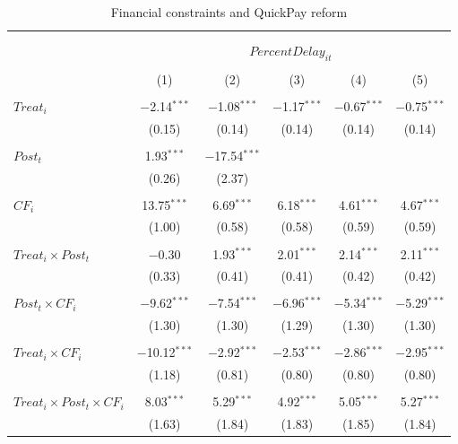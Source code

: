 \documentclass[
]{article}
\begin{document}
\begin{table}[H] \centering 
  \caption{Financial constraints and QuickPay reform} 
  \label{} 
\small 
\begin{tabular}{@{\extracolsep{-2pt}}lccccc} 
\\[-1.8ex]\hline 
\hline \\[-1.8ex] 
\\[-1.8ex] & \multicolumn{5}{c}{$PercentDelay_{it}$  } \\ 
\\[-1.8ex] & (1) & (2) & (3) & (4) & (5)\\ 
\hline \\[-1.8ex] 
 $Treat_i$ & $-$2.14$^{***}$ & $-$1.08$^{***}$ & $-$1.17$^{***}$ & $-$0.67$^{***}$ & $-$0.75$^{***}$ \\ 
  & (0.15) & (0.14) & (0.14) & (0.14) & (0.14) \\ 
  & & & & & \\ 
 $Post_t$ & 1.93$^{***}$ & $-$17.54$^{***}$ &  &  &  \\ 
  & (0.26) & (2.37) &  &  &  \\ 
  & & & & & \\ 
 $CF_i$ & 13.75$^{***}$ & 6.69$^{***}$ & 6.18$^{***}$ & 4.61$^{***}$ & 4.67$^{***}$ \\ 
  & (1.00) & (0.58) & (0.58) & (0.59) & (0.59) \\ 
  & & & & & \\ 
 $Treat_i \times Post_t$ & $-$0.30 & 1.93$^{***}$ & 2.01$^{***}$ & 2.14$^{***}$ & 2.11$^{***}$ \\ 
  & (0.33) & (0.41) & (0.41) & (0.42) & (0.42) \\ 
  & & & & & \\ 
 $Post_t \times CF_i$ & $-$9.62$^{***}$ & $-$7.54$^{***}$ & $-$6.96$^{***}$ & $-$5.34$^{***}$ & $-$5.29$^{***}$ \\ 
  & (1.30) & (1.30) & (1.29) & (1.30) & (1.30) \\ 
  & & & & & \\ 
 $Treat_i \times CF_i$ & $-$10.12$^{***}$ & $-$2.92$^{***}$ & $-$2.53$^{***}$ & $-$2.86$^{***}$ & $-$2.95$^{***}$ \\ 
  & (1.18) & (0.81) & (0.80) & (0.80) & (0.80) \\ 
  & & & & & \\ 
 $Treat_i \times Post_t \times CF_i$ & 8.03$^{***}$ & 5.29$^{***}$ & 4.92$^{***}$ & 5.05$^{***}$ & 5.27$^{***}$ \\ 
  & (1.63) & (1.84) & (1.83) & (1.85) & (1.84) \\ 

\end{tabular}
\end{table}
\end{document}
